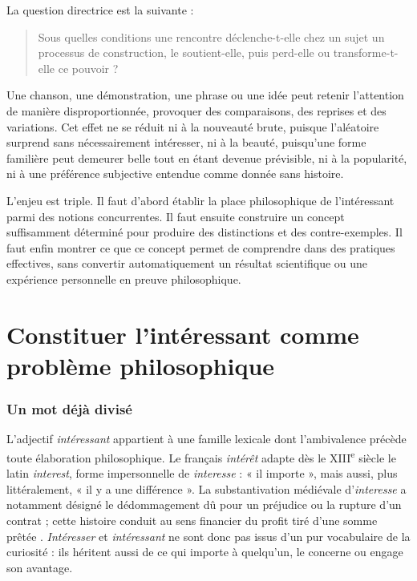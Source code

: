 \documentclass[11pt,a4paper]{article}
\begin{document}
La question directrice est la suivante :

\begin{quote}
Sous quelles conditions une rencontre déclenche-t-elle chez un sujet un
processus de construction, le soutient-elle, puis perd-elle ou transforme-t-elle
ce pouvoir ?
\end{quote}

Une chanson, une démonstration, une phrase ou une idée peut retenir l'attention
de manière disproportionnée, provoquer des comparaisons, des reprises et des
variations. Cet effet ne se réduit ni à la nouveauté brute, puisque l'aléatoire
surprend sans nécessairement intéresser, ni à la beauté, puisqu'une forme
familière peut demeurer belle tout en étant devenue prévisible, ni à la
popularité, ni à une préférence subjective entendue comme donnée sans histoire.

L'enjeu est triple. Il faut d'abord établir la place philosophique de
l'intéressant parmi des notions concurrentes. Il faut ensuite construire un
concept suffisamment déterminé pour produire des distinctions et des
contre-exemples. Il faut enfin montrer ce que ce concept permet de comprendre
dans des pratiques effectives, sans convertir automatiquement un résultat
scientifique ou une expérience personnelle en preuve philosophique.

\part{Constituer l'intéressant comme problème philosophique}

\section{Un mot déjà divisé}

L'adjectif \emph{intéressant} appartient à une famille lexicale dont
l'ambivalence précède toute élaboration philosophique. Le français
\emph{intérêt} adapte dès le XIII\textsuperscript{e} siècle le latin
\emph{interest}, forme impersonnelle de \emph{interesse} : « il importe », mais
aussi, plus littéralement, « il y a une différence ». La substantivation
médiévale d'\emph{interesse} a notamment désigné le dédommagement dû pour un
préjudice ou la rupture d'un contrat ; cette histoire conduit au sens financier
du profit tiré d'une somme prêtée
\parencite{academie2026interet,cnrtl2026interet}. \emph{Intéresser} et
\emph{intéressant} ne sont donc pas issus d'un pur vocabulaire de la curiosité :
ils héritent aussi de ce qui importe à quelqu'un, le concerne ou engage son
avantage.
\end{document}

